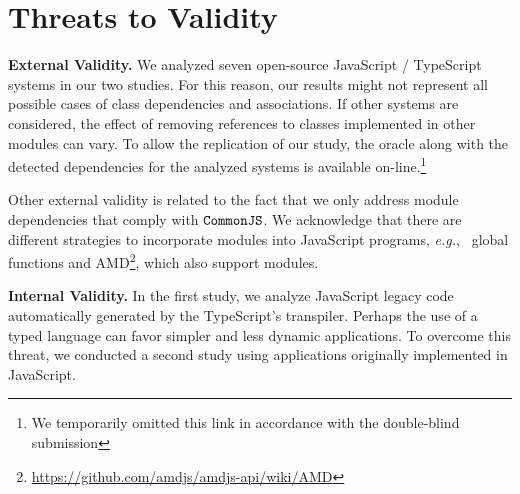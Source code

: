 \documentclass[review]{elsarticle}
\newcommand{\mcode}[1]{$\tt #1$}
\begin{document}

\section{Threats to Validity}
\label{sec:threats}

\noindent \textbf{External Validity.} We analyzed seven open-source JavaScript / TypeScript systems in our two studies. For this reason, our results might not represent all possible cases of class dependencies and associations. If other systems are considered, the effect of removing references to classes implemented in other modules can vary. To allow the replication of our study, the oracle along with the detected dependencies for the analyzed systems is available on-line.\footnote{We temporarily omitted this link in accordance with the double-blind submission}

Other external validity is related to the fact that we only address module dependencies that comply with \mcode{CommonJS}. We acknowledge that there are different strategies to incorporate modules into JavaScript programs, \emph{e.g.},~ global functions and AMD\footnote{\url{https://github.com/amdjs/amdjs-api/wiki/AMD}}, which also support modules.

\vspace{1.5 mm}

\noindent \textbf{Internal Validity.} In the first study, we analyze JavaScript legacy code automatically generated by the TypeScript's transpiler. Perhaps the use of a typed language can favor simpler and less dynamic applications. To overcome this threat, we conducted a second study using applications originally implemented in JavaScript. 
\end{document}
